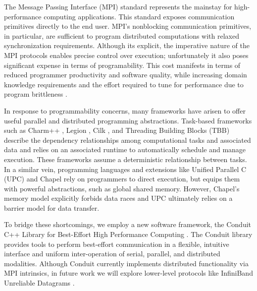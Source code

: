 The Message Passing Interface (MPI) standard \citep{gropp1996high} represents the mainstay for high-performance computing applications.
This standard exposes communication primitives directly to the end user.
MPI's nonblocking communication primitives, in particular, are sufficient to program distributed computations with relaxed synchronization requirements.
Although its explicit, the imperative nature of the MPI protocols enables precise control over execution; unfortunately it also poses significant expense in terms of programability.
This cost manifests in terms of reduced programmer productivity and software quality, while increasing domain knowledge requirements and the effort required to tune for performance due to program brittleness \citep{gu2019comparative, tang2014mpi}.

In response to programmability concerns, many frameworks have arisen to offer useful parallel and distributed programming abstractions.
Task-based frameworks such as Charm++ \citep{kale1993charm++}, Legion \citep{bauer2012legion}, Cilk \citep{blumofe1996cilk}, and Threading Building Blocks (TBB) \citep{reinders2007intel} describe the dependency relationships among computational tasks and associated data and relies on an associated runtime to automatically schedule and manage execution.
These frameworks assume a deterministic relationship between tasks.
In a similar vein, programming languages and extensions like Unified Parallel C (UPC) \citep{el2006upc} and Chapel \citep{chamberlain2007parallel} rely on programmers to direct execution, but equips them with powerful abstractions, such as global shared memory.
However, Chapel's memory model explicitly forbids data races and UPC ultimately relies on a barrier model for data transfer.

To bridge these shortcomings, we employ a new software framework, the Conduit C++ Library for Best-Effort High Performance Computing \citep{moreno2021conduit}.
The Conduit library provides tools to perform best-effort communication in a flexible, intuitive interface and uniform inter-operation of serial, parallel, and distributed modalities.
Although Conduit currently implements distributed functionality via MPI intrinsics, in future work we will explore lower-level protocols like InfiniBand Unreliable Datagrams \citep{kashyap2006ip, koop2007high}.

